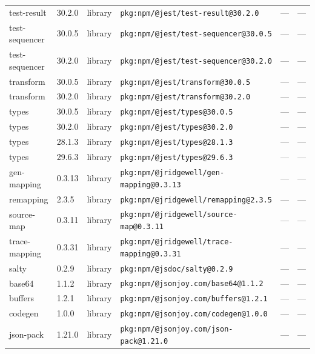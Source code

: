 \documentclass[11pt,a4paper]{article}
\begin{document}
\begin{longtable}{|p{4cm}|p{2cm}|p{1.6cm}|p{5cm}|p{1.5cm}|p{3.5cm}|}
\raggedright test-result & 30.2.0 & library & \small\texttt{pkg:npm/@jest/test-result@30.2.0} & — & \small — \\
\raggedright test-sequencer & 30.0.5 & library & \small\texttt{pkg:npm/@jest/test-sequencer@30.0.5} & — & \small — \\
\raggedright test-sequencer & 30.2.0 & library & \small\texttt{pkg:npm/@jest/test-sequencer@30.2.0} & — & \small — \\
\raggedright transform & 30.0.5 & library & \small\texttt{pkg:npm/@jest/transform@30.0.5} & — & \small — \\
\raggedright transform & 30.2.0 & library & \small\texttt{pkg:npm/@jest/transform@30.2.0} & — & \small — \\
\raggedright types & 30.0.5 & library & \small\texttt{pkg:npm/@jest/types@30.0.5} & — & \small — \\
\raggedright types & 30.2.0 & library & \small\texttt{pkg:npm/@jest/types@30.2.0} & — & \small — \\
\raggedright types & 28.1.3 & library & \small\texttt{pkg:npm/@jest/types@28.1.3} & — & \small — \\
\raggedright types & 29.6.3 & library & \small\texttt{pkg:npm/@jest/types@29.6.3} & — & \small — \\
\raggedright gen-mapping & 0.3.13 & library & \small\texttt{pkg:npm/@jridgewell/gen-mapping@0.3.13} & — & \small — \\
\raggedright remapping & 2.3.5 & library & \small\texttt{pkg:npm/@jridgewell/remapping@2.3.5} & — & \small — \\
\raggedright source-map & 0.3.11 & library & \small\texttt{pkg:npm/@jridgewell/source-map@0.3.11} & — & \small — \\
\raggedright trace-mapping & 0.3.31 & library & \small\texttt{pkg:npm/@jridgewell/trace-mapping@0.3.31} & — & \small — \\
\raggedright salty & 0.2.9 & library & \small\texttt{pkg:npm/@jsdoc/salty@0.2.9} & — & \small — \\
\raggedright base64 & 1.1.2 & library & \small\texttt{pkg:npm/@jsonjoy.com/base64@1.1.2} & — & \small — \\
\raggedright buffers & 1.2.1 & library & \small\texttt{pkg:npm/@jsonjoy.com/buffers@1.2.1} & — & \small — \\
\raggedright codegen & 1.0.0 & library & \small\texttt{pkg:npm/@jsonjoy.com/codegen@1.0.0} & — & \small — \\
\raggedright json-pack & 1.21.0 & library & \small\texttt{pkg:npm/@jsonjoy.com/json-pack@1.21.0} & — & \small — \\

\end{longtable}
\end{document}
